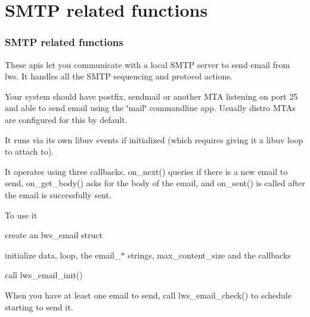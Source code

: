 \hypertarget{group__smtp}{}\section{S\+M\+TP related functions}
\label{group__smtp}
\subsubsection*{S\+M\+TP related functions}

These apis let you communicate with a local S\+M\+TP server to send email from lws. It handles all the S\+M\+TP sequencing and protocol actions.

Your system should have postfix, sendmail or another M\+TA listening on port 25 and able to send email using the \char`\"{}mail\char`\"{} commandline app. Usually distro M\+T\+As are configured for this by default.

It runs via its own libuv events if initialized (which requires giving it a libuv loop to attach to).

It operates using three callbacks, on\+\_\+next() queries if there is a new email to send, on\+\_\+get\+\_\+body() asks for the body of the email, and on\+\_\+sent() is called after the email is successfully sent.

To use it


\begin{DoxyItemize}
\item create an lws\+\_\+email struct
\item initialize data, loop, the email\+\_\+$\ast$ strings, max\+\_\+content\+\_\+size and the callbacks
\item call lws\+\_\+email\+\_\+init()
\end{DoxyItemize}

When you have at least one email to send, call lws\+\_\+email\+\_\+check() to schedule starting to send it. 